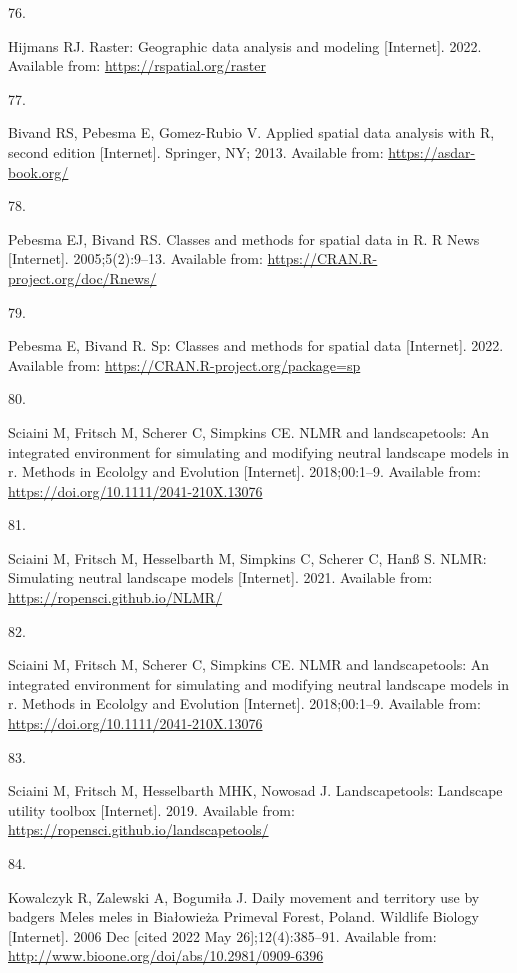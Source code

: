 \documentclass[10pt,a4paper]{article}
\newlength{\cslhangindent}
\newlength{\csllabelwidth}
\newlength{\cslentryspacingunit} %
\newenvironment{CSLReferences}[2] %
 {%
  \setlength{\parindent}{0pt}
  \ifodd #1
  \let\oldpar\par
  \def\par{\hangindent=\cslhangindent\oldpar}
  \fi
  \setlength{\parskip}{#2\cslentryspacingunit}
 }%
 {}
\newcommand{\CSLLeftMargin}[1]{\parbox[t]{\csllabelwidth}{#1}}
\newcommand{\CSLRightInline}[1]{\parbox[t]{\linewidth - \csllabelwidth}{#1}\break}
\begin{document}
\begin{CSLReferences}{0}{0}
\leavevmode\hypertarget{ref-R-raster}{}%
\CSLLeftMargin{76. }
\CSLRightInline{Hijmans RJ. Raster: Geographic data analysis and modeling {[}Internet{]}. 2022. Available from: \url{https://rspatial.org/raster}}

\leavevmode\hypertarget{ref-sp2013}{}%
\CSLLeftMargin{77. }
\CSLRightInline{Bivand RS, Pebesma E, Gomez-Rubio V. Applied spatial data analysis with {R}, second edition {[}Internet{]}. Springer, NY; 2013. Available from: \url{https://asdar-book.org/}}

\leavevmode\hypertarget{ref-sp2005}{}%
\CSLLeftMargin{78. }
\CSLRightInline{Pebesma EJ, Bivand RS. Classes and methods for spatial data in {R}. R News {[}Internet{]}. 2005;5(2):9--13. Available from: \url{https://CRAN.R-project.org/doc/Rnews/}}

\leavevmode\hypertarget{ref-R-sp}{}%
\CSLLeftMargin{79. }
\CSLRightInline{Pebesma E, Bivand R. Sp: Classes and methods for spatial data {[}Internet{]}. 2022. Available from: \url{https://CRAN.R-project.org/package=sp}}

\leavevmode\hypertarget{ref-NLMR2018}{}%
\CSLLeftMargin{80. }
\CSLRightInline{Sciaini M, Fritsch M, Scherer C, Simpkins CE. NLMR and landscapetools: An integrated environment for simulating and modifying neutral landscape models in r. Methods in Ecololgy and Evolution {[}Internet{]}. 2018;00:1--9. Available from: \url{https://doi.org/10.1111/2041-210X.13076}}

\leavevmode\hypertarget{ref-R-NLMR}{}%
\CSLLeftMargin{81. }
\CSLRightInline{Sciaini M, Fritsch M, Hesselbarth M, Simpkins C, Scherer C, Hanß S. NLMR: Simulating neutral landscape models {[}Internet{]}. 2021. Available from: \url{https://ropensci.github.io/NLMR/}}

\leavevmode\hypertarget{ref-landscapetools2018}{}%
\CSLLeftMargin{82. }
\CSLRightInline{Sciaini M, Fritsch M, Scherer C, Simpkins CE. NLMR and landscapetools: An integrated environment for simulating and modifying neutral landscape models in r. Methods in Ecololgy and Evolution {[}Internet{]}. 2018;00:1--9. Available from: \url{https://doi.org/10.1111/2041-210X.13076}}

\leavevmode\hypertarget{ref-R-landscapetools}{}%
\CSLLeftMargin{83. }
\CSLRightInline{Sciaini M, Fritsch M, Hesselbarth MHK, Nowosad J. Landscapetools: Landscape utility toolbox {[}Internet{]}. 2019. Available from: \url{https://ropensci.github.io/landscapetools/}}

\leavevmode\hypertarget{ref-kowalczyk_daily_2006}{}%
\CSLLeftMargin{84. }
\CSLRightInline{Kowalczyk R, Zalewski A, Bogumiła J. Daily movement and territory use by badgers {Meles} meles in {Białowieża} {Primeval} {Forest}, {Poland}. Wildlife Biology {[}Internet{]}. 2006 Dec {[}cited 2022 May 26{]};12(4):385--91. Available from: \url{http://www.bioone.org/doi/abs/10.2981/0909-6396}}


\end{CSLReferences}
\end{document}
